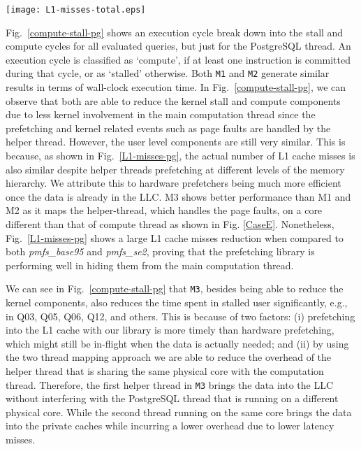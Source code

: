 \begin{figure*}
\centering
\texttt{[image: L1-misses-total.eps]}
\caption{L1 cache misses for PostgreSQL thread normalized with respect to pmfs base95}
\label{L1-misses-pg}
\end{figure*}

Fig.~\ref{compute-stall-pg} shows an execution cycle break down into the stall and compute cycles for all evaluated queries, but just for the PostgreSQL thread. An execution cycle is classified as `compute', if at least one instruction is committed during that cycle, or as `stalled' otherwise. Both \verb+M1+ and \verb+M2+ generate similar results in terms of wall-clock execution time. In Fig.~\ref{compute-stall-pg}, we can observe that both are able to reduce the kernel stall and compute components due to less kernel involvement in the main computation thread since the prefetching and kernel related events such as page faults are handled by the helper thread. However, the user level components are still very similar. This is because, as shown in Fig.~\ref{L1-misses-pg}, the actual number of L1 cache misses is also similar despite helper threads prefetching at different levels of the memory hierarchy. We attribute this to hardware prefetchers being much more efficient once the data is already in the LLC. M3 shows better performance than M1 and M2 as it maps the helper-thread, which handles the page faults, on a core different than that of compute thread as shown in Fig. \ref{CaseE}. Nonetheless, Fig.~\ref{L1-misses-pg} shows a large L1 cache misses reduction when compared to both \emph{pmfs\_base95} and \emph{pmfs\_se2}, proving that the prefetching library is performing well in hiding them from the main computation thread.

We can see in Fig.~\ref{compute-stall-pg} that \verb+M3+, besides being able to reduce the kernel components, also reduces the time spent in stalled user significantly, e.g., in Q03, Q05, Q06, Q12, and others. This is because of two factors: (i) prefetching into the L1 cache with our library is more timely than hardware prefetching, which might still be in-flight when the data is actually needed; and (ii) by using the two thread mapping approach we are able to reduce the overhead of the helper thread that is sharing the same physical core with the computation thread. Therefore, the first helper thread in \verb+M3+ brings the data into the LLC without interfering with the PostgreSQL thread that is running on a different physical core. While the second thread running on the same core brings the data into the private caches while incurring a lower overhead due to lower latency misses.

